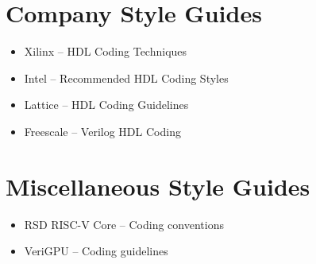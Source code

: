 \begin{appendices}
\section{Company Style Guides}

\begin{itemize}
    \item Xilinx -- HDL Coding Techniques \cite{Xilinxstyleguide}
    \item Intel -- Recommended HDL Coding Styles \cite{Intelstyleguide}
    \item Lattice -- HDL Coding Guidelines \cite{Latticestyleguide}
    \item Freescale -- Verilog HDL Coding \cite{Freescalestyleguide}
\end{itemize}

\section{Miscellaneous Style Guides}

\begin{itemize}
    \item RSD RISC-V Core -- Coding conventions \cite{RSDstyleguide}
    \item VeriGPU -- Coding guidelines \cite{VeriGPUstyleguide}
\end{itemize}



\end{appendices}
